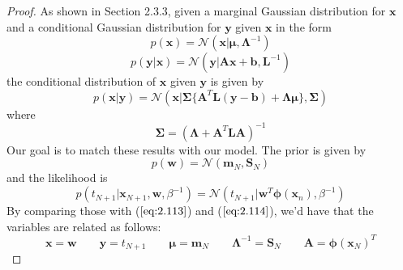 \begin{proof}
    As shown in Section 2.3.3, given a marginal Gaussian distribution for 
    $\mathbf{x}$ and a conditional Gaussian distribution for $\mathbf{y}$
    given $\mathbf{x}$ in the form
    \begin{equation}\label{eq:2.113}\tag{2.113}
        p(\mathbf{x}) = \mathcal{N}(\mathbf{x} | \bm{\mu}, \mathbf{\Lambda}^{-1})
    \end{equation}
    \vspace{-1em}
    \begin{equation}\label{eq:2.114}\tag{2.114}
        p(\mathbf{y} | \mathbf{x}) 
        = \mathcal{N}(\mathbf{y} | \mathbf{Ax} + \mathbf{b}, \mathbf{L}^{-1})
    \end{equation}
    the conditional distribution of $\mathbf{x}$ given $\mathbf{y}$ is given
    by
    \begin{equation}\label{eq:2.116}\tag{2.116}
        p(\mathbf{x} | \mathbf{y}) 
        = \mathcal{N}(\mathbf{x} | \mathbf{\Sigma}
            \{\mathbf{A}^T\mathbf{L}(\mathbf{y} - \mathbf{b}) + \mathbf{\Lambda}\bm{\mu}\}, \mathbf{\Sigma})
    \end{equation}
    where
    \begin{equation}\label{eq:2.117}\tag{2.117}
        \mathbf{\Sigma} = (\mathbf{\Lambda} + \mathbf{A}^T\mathbf{L}\mathbf{A})^{-1}
    \end{equation}
    Our goal is to match these results with our model.
    The prior is given by
    \begin{equation*}
        p(\mathbf{w}) = \mathcal{N}(\mathbf{m}_N, \mathbf{S}_N)
    \end{equation*}
    and the likelihood is
    \begin{equation*}
        p(t_{N + 1} | \mathbf{x}_{N + 1}, \mathbf{w}, \beta^{-1}) 
        = \mathcal{N}(t_{N + 1} | \mathbf{w}^T\bm{\phi}(\mathbf{x}_n), \beta^{-1})
    \end{equation*}
    By comparing those with ($\ref{eq:2.113}$) and ($\ref{eq:2.114}$), we'd have that
    the variables are related as follows: 
    \begin{equation*}
        \mathbf{x} = \mathbf{w}
        \hspace{2em}
        \mathbf{y} = t_{N + 1}
        \hspace{2em}
        \bm{\mu} = \mathbf{m}_N
        \hspace{2em}
        \mathbf{\Lambda}^{-1} = \mathbf{S}_N
        \hspace{2em}
        \mathbf{A} = \bm{\phi}(\mathbf{x}_N)^T

\end{equation*}
\end{proof}
